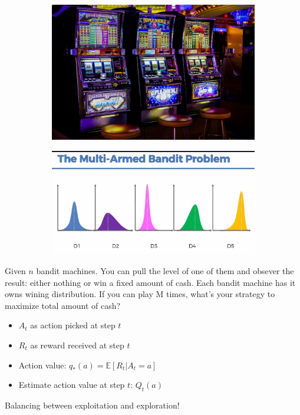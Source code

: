 \documentclass[10pt]{beamer}
\theoremstyle{remark}
\begin{document}
\begin{frame}
    \begin{figure}
        \begin{subfigure}{0.45\textwidth}
            \includegraphics[width=\textwidth]{figures/multiarmed-bandit1.jpg}
        \end{subfigure}
        \begin{subfigure}{0.45\textwidth}
            \includegraphics[width=\textwidth]{figures/multiarmed-bandit.jpg}
        \end{subfigure}
    \end{figure}
    Given $n$ bandit machines. You can pull the level of one of them and obsever the result: either nothing or win a fixed amount of cash. Each bandit machine has it owns wining distribution. If you can play M times, what's your strategy to maximize total amount of cash?
    \begin{itemize}
        \item $A_t$ as action picked at step $t$
        \item  $R_t$ as reward received at step  $t$
        \item  Action value: $q_{*}(a) = \mathbb{E}[R_t | A_t = a]$
        \item Estimate action value at step $t$: $Q_t(a)$
    \end{itemize}
    Balancing between exploitation and exploration!
\end{frame}
\end{document}
